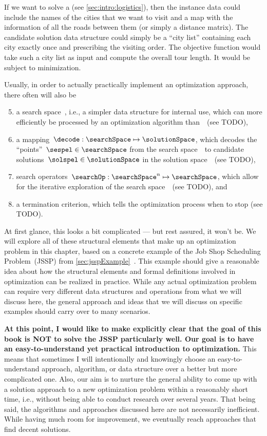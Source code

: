 %
If we want to solve a  (see \autoref{sec:intro:logistics}), then the instance data could include the names of the cities that we want to visit and a map with the information of all the roads between them (or simply a distance matrix).
The candidate solution data structure could simply be a ``city list'' containing each city exactly once and prescribing the visiting order.
The objective function would take such a city list as input and compute the overall tour length.
It would be subject to minimization.

Usually, in order to actually practically implement an optimization approach, there often will also be%
%
\begin{enumerate}%
\setcounter{enumi}{4}%
%
\item a search space~\searchSpace, i.e., a simpler data structure for internal use, which can more efficiently be processed by an optimization algorithm than~\solutionSpace\ (see TODO),%
%
\item a mapping~$\decode:\searchSpace\mapsto\solutionSpace$, which decodes the ``points''~$\sespel\in\searchSpace$ from the search space~\searchSpace\ to candidate solutions~$\solspel\in\solutionSpace$ in the solution space~\solutionSpace\ (see TODO),%
%
\item search operators~$\searchOp:\searchSpace^n\mapsto\searchSpace$, which allow for the iterative exploration of the search space~\searchSpace\ (see TODO), and%
%
\item a termination criterion, which tells the optimization process when to stop (see TODO).%
%
\end{enumerate}%
%
At first glance, this looks a bit complicated --- but rest assured, it won't be.
We will explore all of these structural elements that make up an optimization problem in this chapter, based on a concrete example of the Job Shop Scheduling Problem~(JSSP) from \autoref{sec:jsspExample}~\cite{GLLRK1979OAAIDSASAS,LLRKS1993SASAAC,L1982RRITTOMS,T1993BFBSP,BDP1996TJSSPCANST}.
This example should give a reasonable idea about how the structural elements and formal definitions involved in optimization can be realized in practice.
While any actual optimization problem can require very different data structures and operations from what we will discuss here, the general approach and ideas that we will discuss on specific examples should carry over to many scenarios.

\textbf{At this point, I would like to make explicitly clear that the goal of this book is NOT to solve the JSSP particularly well. Our goal is to have an easy-to-understand yet practical introduction to optimization.}
This means that sometimes I will intentionally and knowingly choose an easy-to-understand approach, algorithm, or data structure over a better but more complicated one.
Also, our aim is to nurture the general ability to come up with a solution approach to a new optimization problem within a reasonably short time, i.e., without being able to conduct research over several years.
That being said, the algorithms and approaches discussed here are not necessarily inefficient.
While having much room for improvement, we eventually reach approaches that find decent solutions.
\endhsection%
%

